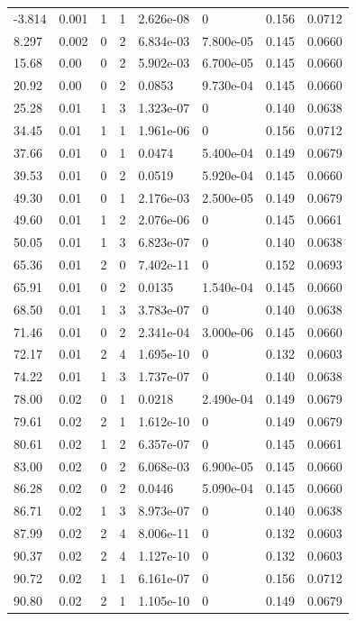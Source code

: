 \documentclass[preview]{standalone}
\begin{document}
{{\begin{tabular}{L{1.2cm}C{1.2cm} C{0.3cm}C{0.5cm} C{1.4cm}C{1.4cm} C{1.4cm}C{1.4cm}}
  -3.814  &  0.001  & 1     &  1 &  2.626e-08  & 0  & 0.156 &  0.0712   \\ 
  8.297  &  0.002  & 0     &  2 &  6.834e-03  & 7.800e-05  & 0.145 &  0.0660   \\ 
  15.68  &  0.00  & 0     &  2 &  5.902e-03  & 6.700e-05  & 0.145 &  0.0660   \\ 
  20.92  &  0.00  & 0     &  2 &  0.0853  & 9.730e-04  & 0.145 &  0.0660   \\ 
  25.28  &  0.01  & 1     &  3 &  1.323e-07  & 0  & 0.140 &  0.0638   \\ 
  34.45  &  0.01  & 1     &  1 &  1.961e-06  & 0  & 0.156 &  0.0712   \\ 
  37.66  &  0.01  & 0     &  1 &  0.0474  & 5.400e-04  & 0.149 &  0.0679   \\ 
  39.53  &  0.01  & 0     &  2 &  0.0519  & 5.920e-04  & 0.145 &  0.0660   \\ 
  49.30  &  0.01  & 0     &  1 &  2.176e-03  & 2.500e-05  & 0.149 &  0.0679   \\ 
  49.60  &  0.01  & 1     &  2 &  2.076e-06  & 0  & 0.145 &  0.0661   \\ 
  50.05  &  0.01  & 1     &  3 &  6.823e-07  & 0  & 0.140 &  0.0638   \\ 
  65.36  &  0.01  & 2     &  0 &  7.402e-11  & 0  & 0.152 &  0.0693   \\ 
  65.91  &  0.01  & 0     &  2 &  0.0135  & 1.540e-04  & 0.145 &  0.0660   \\ 
  68.50  &  0.01  & 1     &  3 &  3.783e-07  & 0  & 0.140 &  0.0638   \\ 
  71.46  &  0.01  & 0     &  2 &  2.341e-04  & 3.000e-06  & 0.145 &  0.0660   \\ 
  72.17  &  0.01  & 2     &  4 &  1.695e-10  & 0  & 0.132 &  0.0603   \\ 
  74.22  &  0.01  & 1     &  3 &  1.737e-07  & 0  & 0.140 &  0.0638   \\ 
  78.00  &  0.02  & 0     &  1 &  0.0218  & 2.490e-04  & 0.149 &  0.0679   \\ 
  79.61  &  0.02  & 2     &  1 &  1.612e-10  & 0  & 0.149 &  0.0679   \\ 
  80.61  &  0.02  & 1     &  2 &  6.357e-07  & 0  & 0.145 &  0.0661   \\ 
  83.00  &  0.02  & 0     &  2 &  6.068e-03  & 6.900e-05  & 0.145 &  0.0660   \\ 
  86.28  &  0.02  & 0     &  2 &  0.0446  & 5.090e-04  & 0.145 &  0.0660   \\ 
  86.71  &  0.02  & 1     &  3 &  8.973e-07  & 0  & 0.140 &  0.0638   \\ 
  87.99  &  0.02  & 2     &  4 &  8.006e-11  & 0  & 0.132 &  0.0603   \\ 
  90.37  &  0.02  & 2     &  4 &  1.127e-10  & 0  & 0.132 &  0.0603   \\ 
  90.72  &  0.02  & 1     &  1 &  6.161e-07  & 0  & 0.156 &  0.0712   \\ 
  90.80  &  0.02  & 2     &  1 &  1.105e-10  & 0  & 0.149 &  0.0679   \\ 
\hline 
\end{tabular} 

}}
\end{document}
